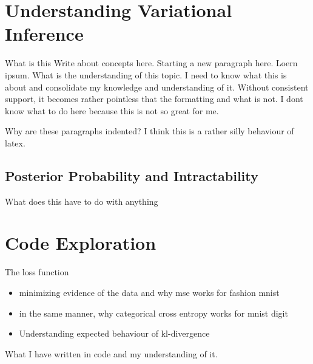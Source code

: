 \documentclass[9pt, a4paper]{article}
\begin{document}
\section{Understanding Variational Inference}
What is this Write about concepts here.
Starting a new paragraph here. Loern ipsum. 
What is the understanding of this topic. 
I need to know what this is about and consolidate my knowledge
and understanding of it. Without consistent support, it becomes rather
pointless that the formatting and what is not. I dont know what to do here because this
is not so great for me.


Why are these paragraphs indented? I think this is a rather silly behaviour of latex.

\subsection{Posterior Probability and Intractability}
What does this have to do with anything
\section{Code Exploration}
The loss function 
\begin{itemize}
    \item minimizing evidence of the data and why mse works for fashion mnist
    \item in the same manner, why categorical cross entropy works for mnist digit
    \item Understanding expected behaviour of kl-divergence
\end{itemize}
What I have written in code and my understanding of it.
\end{document}
